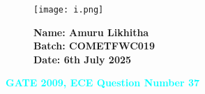 \documentclass[12pt]{article}
\begin{document}
\begin{figure}[H]
    \begin{minipage}{0.45\textwidth}
        \texttt{[image: i.png]} %
    \end{minipage} \hfill
    \begin{minipage}{0.45\textwidth}
        \textbf{Name: Amuru Likhitha} \\
        \textbf{Batch: COMETFWC019} \\
        \textbf{Date: 6th July 2025}
    \end{minipage}
\end{figure}

\begin{center}
    {\LARGE \textbf{\textcolor{cyan}{GATE 2009, ECE Question Number 37}}}
\end{center}
\vspace{1em}
\end{document}
